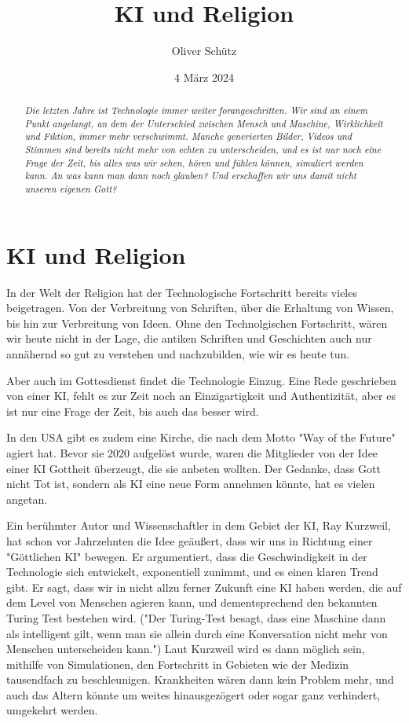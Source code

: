 \documentclass[10pt]{article}
\title{KI und Religion}
\author{Oliver Schütz}
\date{4 März 2024}
\begin{document}
\overfullrule=0pt

\maketitle
\begin{abstract}
  \noindent\textit
  {Die letzten Jahre ist Technologie immer weiter forangeschritten.
  Wir sind an einem Punkt angelangt, an dem der Unterschied zwischen Mensch und Maschine,
  Wirklichkeit und Fiktion, immer mehr verschwimmt.
  Manche generierten Bilder, Videos und Stimmen sind bereits nicht mehr von echten zu unterscheiden,
  und es ist nur noch eine Frage der Zeit, bis alles was wir sehen, hören und fühlen können, simuliert werden kann.
  An was kann man dann noch glauben? Und erschaffen wir uns damit nicht unseren eigenen Gott?
  }
\end{abstract}

\tableofcontents
\newpage
\section{KI und Religion}
In der Welt der Religion hat der Technologische Fortschritt bereits vieles beigetragen.
Von der Verbreitung von Schriften, über die Erhaltung von Wissen, bis hin zur Verbreitung von Ideen.
Ohne den Technolgischen Fortschritt, wären wir heute nicht in der Lage, die antiken Schriften und Geschichten auch nur annähernd so gut zu verstehen und nachzubilden, wie wir es heute tun.

Aber auch im Gottesdienst findet die Technologie Einzug.
Eine Rede geschrieben von einer KI, fehlt es zur Zeit noch an Einzigartigkeit und Authentizität, aber es ist nur eine Frage der Zeit, bis auch das besser wird.

In den USA gibt es zudem eine Kirche, die nach dem Motto "Way of the Future" agiert hat.
Bevor sie 2020 aufgelöst wurde, waren die Mitglieder von der Idee einer KI Gottheit überzeugt, die sie anbeten wollten.
Der Gedanke, dass Gott nicht Tot ist, sondern als KI eine neue Form annehmen könnte, hat es vielen angetan.
\cite{BR}

Ein berühmter Autor und Wissenschaftler in dem Gebiet der KI, Ray Kurzweil, hat schon vor Jahrzehnten die Idee geäußert, dass wir uns in Richtung einer "Göttlichen KI" bewegen.
Er argumentiert, dass die Geschwindigkeit in der Technologie sich entwickelt, exponentiell zunimmt, und es einen klaren Trend gibt.
Er sagt, dass wir in nicht allzu ferner Zukunft eine KI haben werden, die auf dem Level von Menschen agieren kann, und dementsprechend den bekannten Turing Test bestehen wird.
("Der Turing-Test besagt, dass eine Maschine dann als intelligent gilt, wenn man sie allein durch eine Konversation nicht mehr von Menschen unterscheiden kann.")
Laut Kurzweil wird es dann möglich sein, mithilfe von Simulationen, den Fortschritt in Gebieten wie der Medizin tausendfach zu beschleunigen.
Krankheiten wären dann kein Problem mehr, und auch das Altern könnte um weites hinausgezögert oder sogar ganz verhindert, umgekehrt werden.
\end{document}
